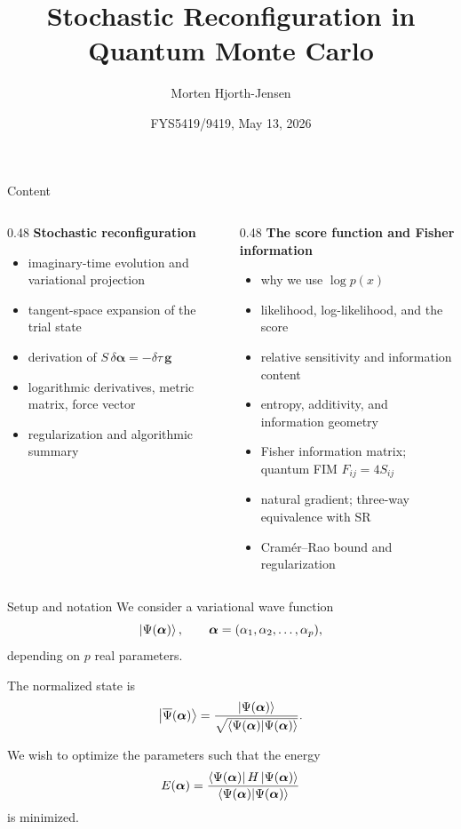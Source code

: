 \documentclass[aspectratio=169]{beamer}
\title{Stochastic Reconfiguration in Quantum Monte Carlo}
\author{Morten Hjorth-Jensen}
\date{FYS5419/9419, May 13, 2026}
\begin{document}
\frame{\titlepage}

\begin{frame}{Content}
\begin{columns}[T]
\begin{column}{0.48\textwidth}
\textbf{Stochastic reconfiguration}
\begin{itemize}
  \item imaginary-time evolution and variational projection
  \item tangent-space expansion of the trial state
  \item derivation of \(S\,\delta\bm{\alpha}=-\delta\tau\,\bm{g}\)
  \item logarithmic derivatives, metric matrix, force vector
  \item regularization and algorithmic summary
\end{itemize}
\end{column}
\begin{column}{0.48\textwidth}
\textbf{The score function and Fisher information}
\begin{itemize}
  \item why we use \(\log p(x)\)
  \item likelihood, log-likelihood, and the score
  \item relative sensitivity and information content
  \item entropy, additivity, and information geometry
  \item Fisher information matrix; quantum FIM \(F_{ij}=4S_{ij}\)
  \item natural gradient; three-way equivalence with SR
  \item Cram\'er--Rao bound and regularization
\end{itemize}
\end{column}
\end{columns}
\end{frame}


\begin{frame}{Setup and notation}
We consider a variational wave function
\[
\ket{\Psi(\bm{\alpha})},
\qquad
\bm{\alpha}=(\alpha_1,\alpha_2,\dots,\alpha_p),
\]
depending on \(p\) real parameters.

\medskip

The normalized state is
\[
\ket{\overline{\Psi}(\bm{\alpha})}
=
\frac{\ket{\Psi(\bm{\alpha})}}
     {\sqrt{\braket{\Psi(\bm{\alpha})}{\Psi(\bm{\alpha})}}}.
\]

We wish to optimize the parameters such that the energy
\[
E(\bm{\alpha})
=
\frac{\bra{\Psi(\bm{\alpha})}H\ket{\Psi(\bm{\alpha})}}
     {\braket{\Psi(\bm{\alpha})}{\Psi(\bm{\alpha})}}
\]
is minimized.
\end{frame}
\end{document}
